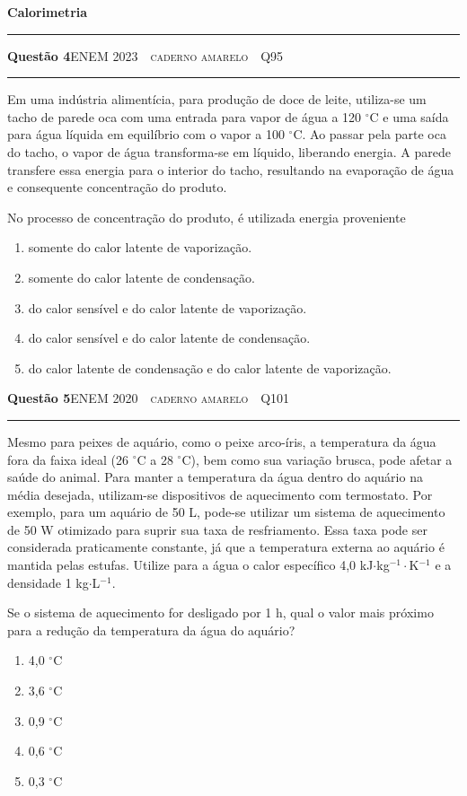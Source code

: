 \documentclass[11pt,a4paper]{article}
\newcommand{\fonte}[1]{{\small\scshape\color{grafite}#1}}
\newenvironment{questao}[2]{%
  \par\addvspace{1.6em}
  \needspace{12\baselineskip}
  {\large\bfseries\color{vinho}Quest\~ao #1}\hfill #2\\[-0.55em]
  {\color{black!25}\rule{\linewidth}{0.4pt}}
  \par\nobreak\smallskip
  \noindent\begin{minipage}{\linewidth}\setlength{\parskip}{0.45em}%
}{\end{minipage}\par\addvspace{0.4em}}
\newcommand{\parte}[1]{%
  \needspace{18\baselineskip}
  \vspace{1.8em}
  {\Large\bfseries #1}\\[-0.55em]
  {\color{black!30}\rule{\linewidth}{0.5pt}}
  \par\nobreak\smallskip
}
\begin{document}
\parte{Calorimetria}

\begin{questao}{4}{\fonte{ENEM 2023 \,\textperiodcentered\, caderno amarelo \,\textperiodcentered\, Q95}}
Em uma ind\'ustria aliment\'icia, para produ\c{c}\~ao de doce de leite,
utiliza-se um tacho de parede oca com uma entrada para vapor de \'agua a
120 $^\circ$C e uma sa\'ida para \'agua l\'iquida em equil\'ibrio com o vapor
a 100 $^\circ$C. Ao passar pela parte oca do tacho, o vapor de \'agua
transforma-se em l\'iquido, liberando energia. A parede transfere essa
energia para o interior do tacho, resultando na evapora\c{c}\~ao de \'agua e
consequente concentra\c{c}\~ao do produto.

No processo de concentra\c{c}\~ao do produto, \'e utilizada energia proveniente
\begin{enumerate}
  \item somente do calor latente de vaporiza\c{c}\~ao.
  \item somente do calor latente de condensa\c{c}\~ao.
  \item do calor sens\'ivel e do calor latente de vaporiza\c{c}\~ao.
  \item do calor sens\'ivel e do calor latente de condensa\c{c}\~ao.
  \item do calor latente de condensa\c{c}\~ao e do calor latente de
        vaporiza\c{c}\~ao.
\end{enumerate}
\end{questao}

\begin{questao}{5}{\fonte{ENEM 2020 \,\textperiodcentered\, caderno amarelo \,\textperiodcentered\, Q101}}
Mesmo para peixes de aqu\'ario, como o peixe arco-\'iris, a temperatura da
\'agua fora da faixa ideal (26 $^\circ$C a 28 $^\circ$C), bem como sua
varia\c{c}\~ao brusca, pode afetar a sa\'ude do animal. Para manter a
temperatura da \'agua dentro do aqu\'ario na m\'edia desejada, utilizam-se
dispositivos de aquecimento com termostato. Por exemplo, para um aqu\'ario
de 50 L, pode-se utilizar um sistema de aquecimento de 50 W otimizado
para suprir sua taxa de resfriamento. Essa taxa pode ser considerada
praticamente constante, j\'a que a temperatura externa ao aqu\'ario \'e
mantida pelas estufas. Utilize para a \'agua o calor espec\'ifico
4,0 kJ$\cdot$kg$^{-1}\cdot$K$^{-1}$ e a densidade 1 kg$\cdot$L$^{-1}$.

Se o sistema de aquecimento for desligado por 1 h, qual o valor mais
pr\'oximo para a redu\c{c}\~ao da temperatura da \'agua do aqu\'ario?
\begin{enumerate}
  \item 4,0 $^\circ$C
  \item 3,6 $^\circ$C
  \item 0,9 $^\circ$C
  \item 0,6 $^\circ$C
  \item 0,3 $^\circ$C
\end{enumerate}
\end{questao}
\end{document}
